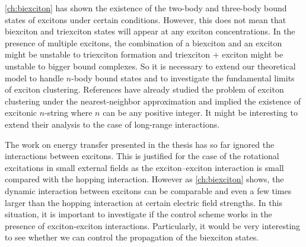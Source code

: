 



\autoref{ch:biexciton} has shown the existence of  the two-body and three-body bound states of excitons under certain 
conditions. However, this does not mean that biexciton and triexciton states will appear at any exciton concentrations. 
In the presence of multiple excitons, the combination of a biexciton and an exciton might be unstable to triexciton formation
 and triexciton $+$ exciton might be unstable to bigger bound complexes.  So it is necessary to extend our theoretical
model to handle $n$-body bound states and to investigate the fundamental limits of exciton clustering. References 
\cite{Ezaki1994, orchinnikov1967, pleutin2000} have already studied the problem of exciton clustering under the 
nearest-neighbor approximation and implied the existence of  excitonic $n$-string where $n$ can be any 
positive integer.  It might be 
interesting to extend their analysis to the case of long-range interactions. 


The work on energy transfer presented in the thesis has so far ignored the interactions between excitons. This is justified for the case of the rotational 
excitations in small external fields as the exciton--exciton interaction is small compared with the hopping interaction. 
However as \autoref{ch:biexciton} shows, the dynamic interaction between excitons can be comparable and even a few 
times larger than the hopping interaction at certain electric field strengths. In this situation, it is important to investigate
 if the control scheme works in the presence of exciton-exciton interactions. Particularly, it would be very interesting to see whether we can control the propagation
 of the biexciton states. 
 
